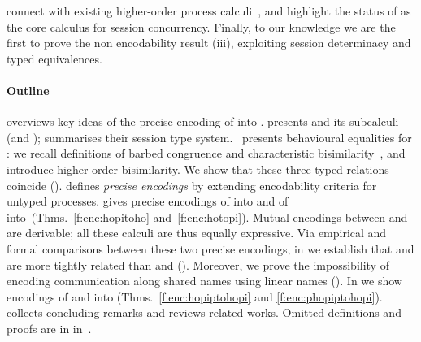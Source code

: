 \documentclass[runningheads]{llncs}
\begin{document}
connect \HOp with existing higher-order process calculi~\cite{tlca07}, and  
 highlight the status of \HO as the core calculus for session concurrency.
Finally, %
to our knowledge we are the first to prove 
the non encodability result (iii),
exploiting session determinacy and typed equivalences.




\paragraph{Outline} 
 overviews key ideas of the precise encoding of \HOp into \sessp.
{} presents \HOp and its 
subcalculi (\HO and \sessp); %
 summarises their session type system.
~pres\-ents  behavioural equalities for \HOp:
we recall definitions of barbed congruence and characteristic bisimilarity~\cite{characteristic_bis}, 
and introduce higher-order bisimilarity.
We show that these three typed relations coincide ().
 defines \emph{precise %
encodings} by extending encodability criteria  for untyped processes. %
{} %
gives {precise encodings} of \HOp into \HO and of \HOp into~\sessp (Thms.~\ref{f:enc:hopitoho} and~\ref{f:enc:hotopi}).
Mutual encodings between \sessp and \HO are derivable; 
all these calculi are thus equally expressive.
Via
empirical and formal comparisons between these two precise encodings, in  we establish that
\HOp and \HO are more tightly related than \HOp and \sessp ().
Moreover, we prove the impossibility of encoding communication along shared names
using linear names ().
In  %
we show 
encodings of \HOpp and \PHOp 
into \HOp
(Thms.~\ref{f:enc:hopiptohopi} and \ref{f:enc:phopiptohopi}).
{} collects concluding remarks and reviews related works.
{Omitted definitions and  proofs are in %
in~\cite{KouzapasPY15}.} 
\end{document}
